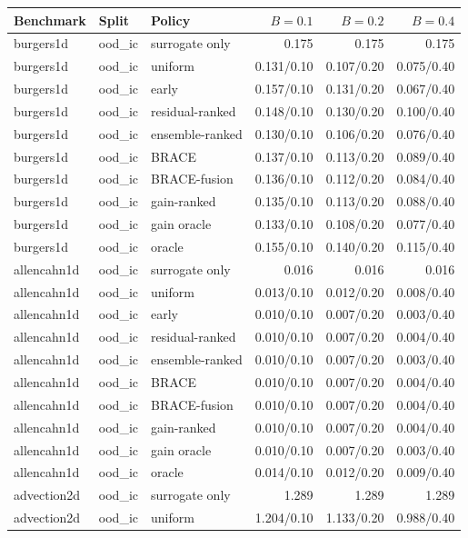 \begin{tabular}{lllrrr}
\toprule
Benchmark & Split & Policy & $B=0.1$ & $B=0.2$ & $B=0.4$ \\
\midrule
burgers1d & ood\_ic & surrogate only & 0.175 & 0.175 & 0.175 \\
burgers1d & ood\_ic & uniform & 0.131/0.10 & 0.107/0.20 & 0.075/0.40 \\
burgers1d & ood\_ic & early & 0.157/0.10 & 0.131/0.20 & 0.067/0.40 \\
burgers1d & ood\_ic & residual-ranked & 0.148/0.10 & 0.130/0.20 & 0.100/0.40 \\
burgers1d & ood\_ic & ensemble-ranked & 0.130/0.10 & 0.106/0.20 & 0.076/0.40 \\
burgers1d & ood\_ic & BRACE & 0.137/0.10 & 0.113/0.20 & 0.089/0.40 \\
burgers1d & ood\_ic & BRACE-fusion & 0.136/0.10 & 0.112/0.20 & 0.084/0.40 \\
burgers1d & ood\_ic & gain-ranked & 0.135/0.10 & 0.113/0.20 & 0.088/0.40 \\
burgers1d & ood\_ic & gain oracle & 0.133/0.10 & 0.108/0.20 & 0.077/0.40 \\
burgers1d & ood\_ic & oracle & 0.155/0.10 & 0.140/0.20 & 0.115/0.40 \\
\midrule
allencahn1d & ood\_ic & surrogate only & 0.016 & 0.016 & 0.016 \\
allencahn1d & ood\_ic & uniform & 0.013/0.10 & 0.012/0.20 & 0.008/0.40 \\
allencahn1d & ood\_ic & early & 0.010/0.10 & 0.007/0.20 & 0.003/0.40 \\
allencahn1d & ood\_ic & residual-ranked & 0.010/0.10 & 0.007/0.20 & 0.004/0.40 \\
allencahn1d & ood\_ic & ensemble-ranked & 0.010/0.10 & 0.007/0.20 & 0.003/0.40 \\
allencahn1d & ood\_ic & BRACE & 0.010/0.10 & 0.007/0.20 & 0.004/0.40 \\
allencahn1d & ood\_ic & BRACE-fusion & 0.010/0.10 & 0.007/0.20 & 0.004/0.40 \\
allencahn1d & ood\_ic & gain-ranked & 0.010/0.10 & 0.007/0.20 & 0.004/0.40 \\
allencahn1d & ood\_ic & gain oracle & 0.010/0.10 & 0.007/0.20 & 0.003/0.40 \\
allencahn1d & ood\_ic & oracle & 0.014/0.10 & 0.012/0.20 & 0.009/0.40 \\
\midrule
advection2d & ood\_ic & surrogate only & 1.289 & 1.289 & 1.289 \\
advection2d & ood\_ic & uniform & 1.204/0.10 & 1.133/0.20 & 0.988/0.40 \\

\end{tabular}

